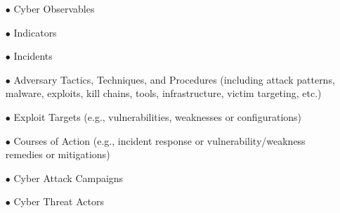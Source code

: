 \documentclass{eplmastersthesis}
\begin{document}
\begin{itemize}
\item[$\bullet$] Cyber Observables
\item[$\bullet$] Indicators
\item[$\bullet$] Incidents
\item[$\bullet$] Adversary Tactics, Techniques, and Procedures (including attack patterns, malware, exploits, kill
chains, tools, infrastructure, victim targeting, etc.)
\item[$\bullet$] Exploit Targets (e.g., vulnerabilities, weaknesses or configurations)
\item[$\bullet$] Courses of Action (e.g., incident response or vulnerability/weakness remedies or mitigations)
\item[$\bullet$] Cyber Attack Campaigns
\item[$\bullet$] Cyber Threat Actors
\end{itemize}
\end{document}

